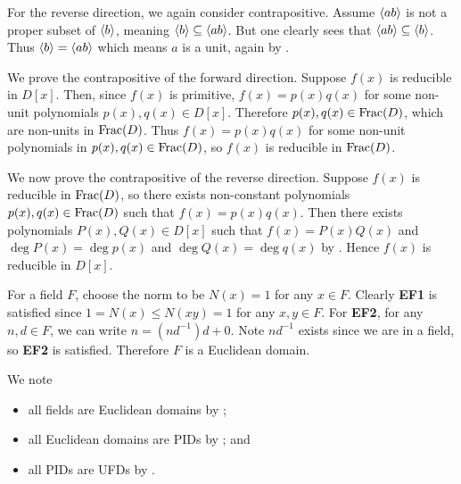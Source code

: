 \begin{questions}
    For the reverse direction, we again consider contrapositive. Assume $\left\langle ab\right\rangle$ is not a proper subset of $\left\langle b\right\rangle$, meaning $\left\langle b\right\rangle \subseteq \left\langle ab\right\rangle$. But one clearly sees that $\left\langle ab\right\rangle \subseteq \left\langle b\right\rangle$. Thus $\left\langle b\right\rangle = \left\langle ab\right\rangle$ which means $a$ is a unit, again by .

    \item We prove the contrapositive of the forward direction. Suppose $f(x)$ is reducible in $D[x]$. Then, since $f(x)$ is primitive, $f(x) = p(x)q(x)$ for some non-unit polynomials $p(x), q(x) \in D[x]$. Therefore $p(x), q(x) \in \mathrm{Frac}(D)$, which are non-units in $\mathrm{Frac}(D)$. Thus $f(x) = p(x)q(x)$ for some non-unit polynomials in $p(x), q(x) \in \mathrm{Frac}(D)$, so $f(x)$ is reducible in $\mathrm{Frac}(D)$.

    We now prove the contrapositive of the reverse direction. Suppose $f(x)$ is reducible in $\mathrm{Frac}(D)$, so there exists non-constant polynomials $p(x), q(x) \in \mathrm{Frac}(D)$ such that $f(x) = p(x)q(x)$. Then there exists polynomials $P(x), Q(x) \in D[x]$ such that $f(x) = P(x)Q(x)$ and $\deg P(x) = \deg p(x)$ and $\deg Q(x) = \deg q(x)$ by . Hence $f(x)$ is reducible in $D[x]$.

    \item For a field $F$, choose the norm to be $N(x) = 1$ for any $x \in F$. Clearly \textbf{EF1} is satisfied since $1 = N(x) \leq N(xy) = 1$ for any $x,y\in F$. For \textbf{EF2}, for any $n, d \in F$, we can write $n = (nd^{-1})d + 0$. Note $nd^{-1}$ exists since we are in a field, so \textbf{EF2} is satisfied. Therefore $F$ is a Euclidean domain.
    
    \item We note
    \begin{itemize}
        \item all fields are Euclidean domains by ;
        \item all Euclidean domains are PIDs by ; and
        \item all PIDs are UFDs by .
    \end{itemize}
\end{questions}
